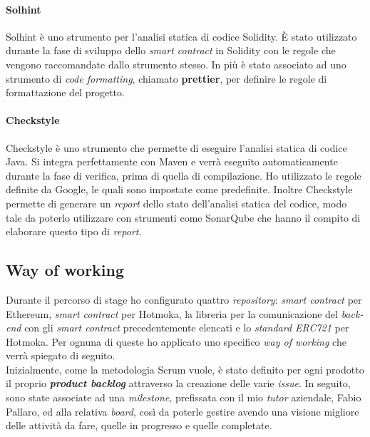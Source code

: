 \paragraph{Solhint}
Solhint è uno strumento per l'analisi statica di codice Solidity. È stato utilizzato durante la fase di sviluppo dello \textit{smart contract} in Solidity con le regole che vengono raccomandate dallo strumento stesso. In più è stato associato ad uno strumento di \textit{code formatting}, chiamato \textbf{prettier}, per definire le regole di formattazione del progetto.


\paragraph{Checkstyle}
Checkstyle è uno strumento che permette di eseguire l'analisi statica di codice Java. Si integra perfettamente con Maven e verrà eseguito automaticamente durante la fase di verifica, prima di quella di compilazione. Ho utilizzato le regole definite da Google, le quali sono impostate come predefinite.
Inoltre Checkstyle permette di generare un \textit{report} dello stato dell'analisi statica del codice, modo tale da poterlo utilizzare con strumenti come SonarQube che hanno il compito di elaborare questo tipo di \textit{report}.



\subsection{Way of working}
Durante il percorso di stage ho configurato quattro \textit{repository}: \textit{smart contract} per Ethereum, \textit{smart contract} per Hotmoka, la libreria per la comunicazione del \textit{back-end} con gli \textit{smart contract} precedentemente elencati e lo \textit{standard ERC721} per Hotmoka. Per ognuna di queste ho applicato uno specifico \textit{way of working} che verrà spiegato di seguito. \\

Inizialmente, come la metodologia Scrum vuole, è stato definito per ogni prodotto il proprio \textbf{\textit{product backlog}} attraverso la creazione delle varie \textit{issue}. In seguito, sono state associate ad una \textit{milestone}, prefissata con il mio \textit{tutor} aziendale, Fabio Pallaro, ed alla relativa \textit{board}, così da poterle gestire avendo una visione migliore delle attività da fare, quelle in progresso e quelle completate.

